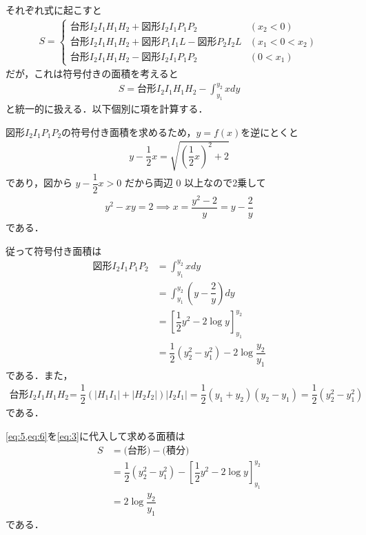 \documentclass[../../main.tex]{subfiles}
\begin{document}
それぞれ式に起こすと
\begin{align}
  S=
  \begin{cases}
    \text{台形} I_2I_1H_1H_2 + \text{図形}I_2I_1P_1P_2 & (x_2 < 0) \\
    \text{台形} I_2I_1H_1H_2 + \text{図形}P_1I_1L - \text{図形}P_2I_2L & (x_1<0<x_2) \\
    \text{台形} I_2I_1H_1H_2 - \text{図形}I_2I_1P_1P_2 & (0<x_1)
  \end{cases}
\end{align}
だが，これは符号付きの面積を考えると
\begin{align}
  S = \text{台形} I_2I_1H_1H_2 - \int_{y_1}^{y_2} x dy \label{eq:3}
\end{align}
と統一的に扱える．以下個別に項を計算する．

$\text{図形}I_2I_1P_1P_2$の符号付き面積を求めるため，$y=f(x)$を逆にとくと
\begin{align}
  y - \dfrac{1}{2}x = \sqrt{\left(\dfrac{1}{2}x\right)^2 + 2}
\end{align}
であり，図から $y - \dfrac{1}{2}x > 0$ だから両辺 $0$ 以上なので2乗して
\begin{align}
  y^2 - xy = 2 \implies x = \dfrac{y^2 - 2}{y} = y - \dfrac{2}{y} \label{eq:4}
\end{align}
である．

従って符号付き面積は
\begin{align}
  \text{図形}I_2I_1P_1P_2
  & = \int_{y_1}^{y_2} x dy \\
  & = \int_{y_1}^{y_2} \left(y-\dfrac{2}{y}\right) dy \\
  & = \left[ \dfrac{1}{2}y^2 - 2\log y \right]_{y_1}^{y_2} \\
  & = \dfrac{1}{2}\left(y_2^2-y_1^2\right) - 2\log\dfrac{y_2}{y_1} \label{eq:5}
\end{align}
である．また，
\begin{align}
  \text{台形} I_2I_1H_1H_2
  & = \dfrac{1}{2}(|H_1I_1|+|H_2I_2|)|I_2I_1|
  = \dfrac{1}{2}(y_1 + y_2)(y_2 - y_1)
  = \dfrac{1}{2}(y_2^2 - y_1^2) \label{eq:6}
\end{align}
である．

\cref{eq:5,eq:6}を\cref{eq:3}に代入して求める面積は
\begin{align}
  S
  &= \text{(台形)} - \text{(積分)} \\
  &= \dfrac{1}{2}(y_2^2 - y_1^2) - \left[ \dfrac{1}{2}y^2 - 2\log y \right]_{y_1}^{y_2} \\
  &= 2\log\dfrac{y_2}{y_1}
\end{align}
である．

\end{document}
